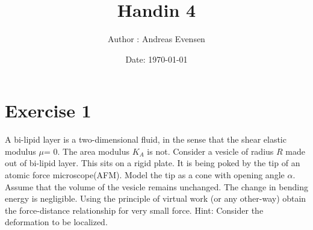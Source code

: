 \documentclass[a4paper]{article}
\title{Handin 4}
\author{Author : Andreas Evensen}
\date{Date: \today}
\begin{document}
\maketitle

\section*{Exercise 1}
A bi-lipid layer is a two-dimensional fluid, in the sense that the shear elastic modulus $\mu$= 0.
The area modulus $K_A$ is not. Consider a vesicle of radius $R$ made out of bi-lipid layer. This sits on a rigid plate.
It is being poked by the tip of an atomic force microscope(AFM). Model the tip as a cone with opening angle $\alpha$. 
Assume that the volume of the vesicle remains unchanged. The change in bending energy is negligible.
Using the principle of virtual work (or any other-way) obtain the force-distance relationship for very small force. Hint: Consider the deformation to be localized.
\end{document}
